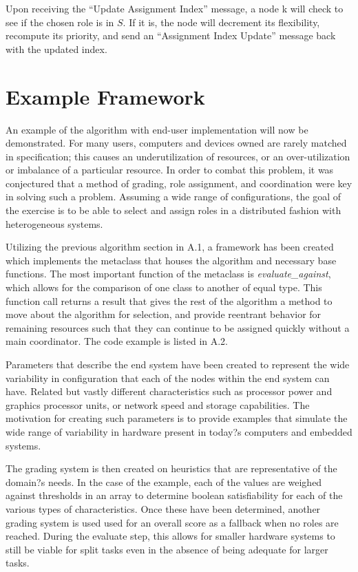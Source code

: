 \documentclass[11pt]{article}
\begin{document}
\begin{multicols}{2}
Upon receiving the ``Update Assignment Index'' message, a node k will check to see if the chosen role is in $S$. If it is, the node will decrement its flexibility, recompute its priority, and send an ``Assignment Index Update'' message back with the updated index.

\section{Example Framework}
An example of the algorithm with end-user implementation will now be demonstrated.  For many users, computers and devices owned are rarely matched in specification; this causes an underutilization of resources, or an over-utilization or imbalance of a particular resource.  In order to combat this problem, it was conjectured that a method of grading, role assignment, and coordination were key in solving such a problem.  Assuming a wide range of configurations, the goal of the exercise is to be able to select and assign roles in a distributed fashion with heterogeneous systems.

Utilizing the previous algorithm section in A.1, a framework has been created which implements the metaclass that houses the algorithm and necessary base functions.  The most important function of the metaclass is \textit{evaluate\_against}, which allows for the comparison of one class to another of equal type.  This function call returns a result that gives the rest of the algorithm a method to move about the algorithm for selection, and provide reentrant behavior for remaining resources such that they can continue to be assigned quickly without a main coordinator.  The code example is listed in A.2.

Parameters that describe the end system have been created to represent the wide variability in configuration that each of the nodes within the end system can have.  Related but vastly different characteristics such as processor power and graphics processor units, or network speed and storage capabilities.  The motivation for creating such parameters is to provide examples that simulate the wide range of variability in hardware present in today?s computers and embedded systems.

The grading system is then created on heuristics that are representative of the domain?s needs.  In the case of the example, each of the values are weighed against thresholds in an array to determine boolean satisfiability for each of the various types of characteristics.  Once these have been determined, another grading system is used used for an overall score as a fallback when no roles are reached.  During the evaluate step, this allows for smaller hardware systems to still be viable for split tasks even in the absence of being adequate for larger tasks.


\end{multicols}
\end{document}
